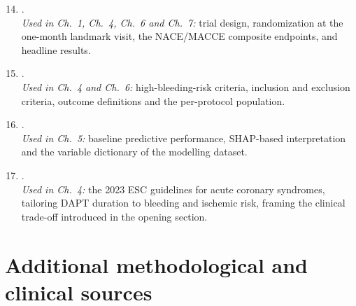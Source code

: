 \begin{enumerate}\setcounter{enumi}{13}
  \item \citet{valgimigli2021masterdapt}.
    \\\textit{Used in Ch.~1, Ch.~4, Ch.~6 and Ch.~7:} trial design,
    randomization at the one-month landmark visit, the NACE/MACCE composite
    endpoints, and headline results.

  \item \citet{valgimigli2021appendix}.
    \\\textit{Used in Ch.~4 and Ch.~6:} high-bleeding-risk criteria, inclusion
    and exclusion criteria, outcome definitions and the per-protocol
    population.

  \item \citet{maroni2026}.
    \\\textit{Used in Ch.~5:} baseline predictive performance, SHAP-based
    interpretation and the variable dictionary of the modelling dataset.

  \item \citet{esc2023acs}.
    \\\textit{Used in Ch.~4:} the 2023 ESC guidelines for acute coronary
    syndromes, tailoring DAPT duration to bleeding and ischemic risk, framing
    the clinical trade-off introduced in the opening section.
\end{enumerate}

\section{Additional methodological and clinical sources}


